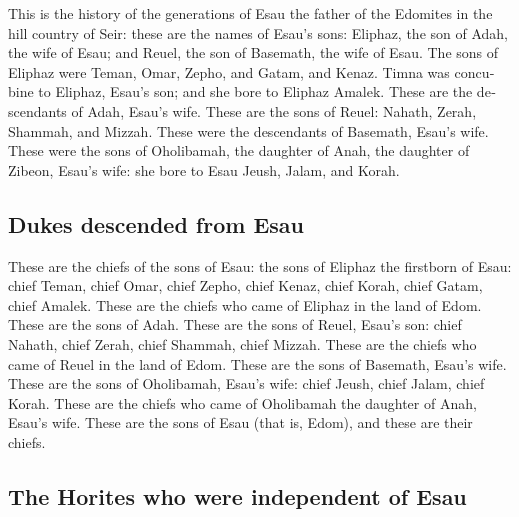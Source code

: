 \begin{paracol}{2}
\begin{otherlanguage}{english}
 This is the history of the generations of Esau the father
of the Edomites in the hill country of Seir:  these are
the names of Esau's sons: Eliphaz, the son of Adah, the wife of Esau;
and Reuel, the son of Basemath, the wife of Esau.  The
sons of Eliphaz were Teman, Omar, Zepho, and Gatam, and Kenaz.
 Timna was concubine to Eliphaz, Esau's son; and she bore
to Eliphaz Amalek. These are the descendants of Adah, Esau's wife.
 These are the sons of Reuel: Nahath, Zerah, Shammah, and
Mizzah. These were the descendants of Basemath, Esau's wife.
 These were the sons of Oholibamah, the daughter of Anah,
the daughter of Zibeon, Esau's wife: she bore to Esau Jeush, Jalam, and
Korah.

\hypertarget{dukes-descended-from-esau}{%
\subsection{Dukes descended from Esau}\label{dukes-descended-from-esau}}

 These are the chiefs of the sons of Esau: the sons of
Eliphaz the firstborn of Esau: chief Teman, chief Omar, chief Zepho,
chief Kenaz,  chief Korah, chief Gatam, chief Amalek.
These are the chiefs who came of Eliphaz in the land of Edom. These are
the sons of Adah.  These are the sons of Reuel, Esau's
son: chief Nahath, chief Zerah, chief Shammah, chief Mizzah. These are
the chiefs who came of Reuel in the land of Edom. These are the sons of
Basemath, Esau's wife.  These are the sons of Oholibamah,
Esau's wife: chief Jeush, chief Jalam, chief Korah. These are the chiefs
who came of Oholibamah the daughter of Anah, Esau's wife.
 These are the sons of Esau (that is, Edom), and these
are their chiefs.

\hypertarget{the-horites-who-were-independent-of-esau}{%
\subsection{The Horites who were independent of
Esau}\label{the-horites-who-were-independent-of-esau}}


\end{otherlanguage}
\end{paracol}
